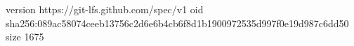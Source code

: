 version https://git-lfs.github.com/spec/v1
oid sha256:089ac58074ceeb13756c2d6e6b4cb6f8d1b1900972535d997f0e19d987c6dd50
size 1675
